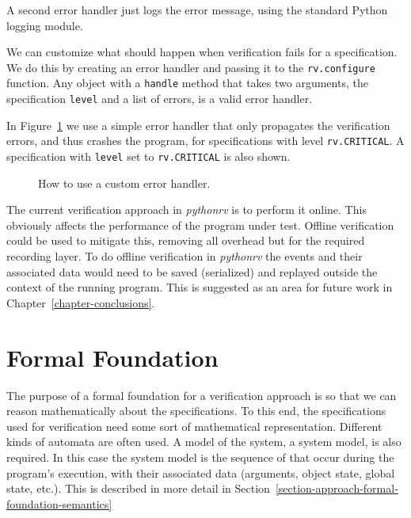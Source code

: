 A second error handler just logs the error message, using the standard Python
logging module.

We can customize what should happen when verification fails for a
specification. We do this by creating an error handler and passing it to the
\texttt{rv.configure} function. Any object with a \texttt{handle} method that
takes two arguments, the specification \texttt{level} and a list of errors, is
a valid error handler.

In Figure~\ref{figure-configure-error-handler} we use a simple error handler
that only propagates the verification errors, and thus crashes the program, for
specifications with level \texttt{rv.CRITICAL}. A specification with
\texttt{level} set to \texttt{rv.CRITICAL} is also shown.

\begin{figure}[h!]
	\begin{center}
	\begin{minipage}{0.7\textwidth}
	
	\end{minipage}
	\end{center}

  \caption{How to use a custom error handler.}
	\label{figure-configure-error-handler}
\end{figure}

The current verification approach in \textit{pythonrv} is to perform it online.
This obviously affects the performance of the program under test. Offline
verification could be used to mitigate this, removing all overhead but for the
required recording layer. To do offline verification in \textit{pythonrv} the
events and their associated data would need to be saved (serialized) and
replayed outside the context of the running program. This is suggested as an
area for future work in Chapter~\ref{chapter-conclusions}.






\section{Formal Foundation} \label{section-approach-formal-foundation}

The purpose of a formal foundation for a verification approach is so that we
can reason mathematically about the specifications. To this end, the
specifications used for verification need some sort of mathematical
representation. Different kinds of automata are often used. A model of the
system, a system model, is also required. In this case the system model is the
sequence of that occur during the program's execution, with their associated
data (arguments, object state, global state, etc.). This is described in more
detail in Section~\ref{section-approach-formal-foundation-semantics}

